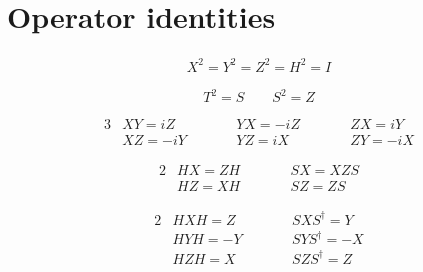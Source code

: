 \documentclass[12pt]{article}
\begin{document}
\section{Operator identities}

\begin{align*}
X^2 = Y^2 = Z^2 = H^2 = I
\end{align*}

\begin{equation*}
T^2 = S \qquad S^2 = Z
\end{equation*}

\begin{alignat*}{3}
& XY = iZ \qquad && YX = -iZ \qquad && ZX = iY \\
& XZ = -iY \qquad && YZ = iX \qquad && ZY = -iX
\end{alignat*}

\begin{alignat*}{2}
& HX = ZH \qquad && SX = XZS \\
& HZ = XH \qquad && SZ = ZS
\end{alignat*}

\begin{alignat*}{2}
& HXH = Z \qquad && SXS^\dagger = Y \\
& HYH = -Y \qquad && SYS^\dagger = -X \\
& HZH = X \qquad && SZS^\dagger = Z
\end{alignat*}
\end{document}
